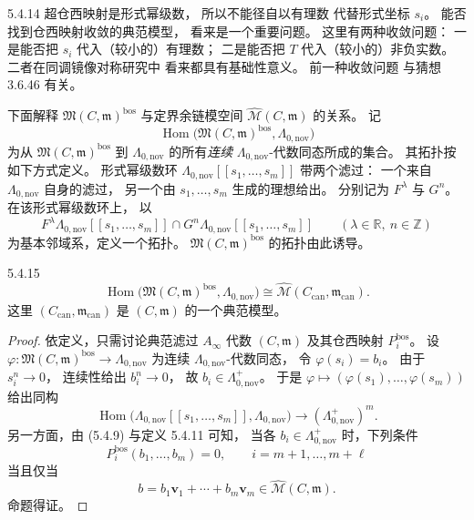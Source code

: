 \begin{remark}{5.4.14}\label{rem:5-4-14}
超仓西映射是形式幂级数，
所以不能径自以有理数
代替形式坐标 $s_i$。
能否找到仓西映射收敛的典范模型，
看来是一个重要问题。
这里有两种收敛问题：
一是能否把 $s_i$
代入（较小的）有理数；
二是能否把 $T$
代入（较小的）非负实数。
二者在同调镜像对称研究中
看来都具有基础性意义。
前一种收敛问题
与猜想 3.6.46 有关。
\end{remark}

下面解释
$\mathfrak M(C,\mathfrak m)^{\mathrm{bos}}$
与定界余链模空间
$\widehat{\mathcal M}(C,\mathfrak m)$
的关系。
记
\[
\operatorname{Hom}\bigl(
\mathfrak M(C,\mathfrak m)^{\mathrm{bos}},
\Lambda_{0,\mathrm{nov}}
\bigr)
\]
为从
$\mathfrak M(C,\mathfrak m)^{\mathrm{bos}}$
到 $\Lambda_{0,\mathrm{nov}}$
的所有\emph{连续}
$\Lambda_{0,\mathrm{nov}}$-代数同态所成的集合。
其拓扑按如下方式定义。
形式幂级数环
$\Lambda_{0,\mathrm{nov}}[[s_1,\ldots,s_m]]$
带两个滤过：
一个来自 $\Lambda_{0,\mathrm{nov}}$
自身的滤过，
另一个由
$s_1,\ldots,s_m$ 生成的理想给出。
分别记为 $F^\lambda$ 与 $G^n$。
在该形式幂级数环上，
以
\[
F^\lambda
\Lambda_{0,\mathrm{nov}}[[s_1,\ldots,s_m]]
\cap
G^n
\Lambda_{0,\mathrm{nov}}[[s_1,\ldots,s_m]]
\qquad
(\lambda\in\mathbb R,\ n\in\mathbb Z)
\]
为基本邻域系，定义一个拓扑。
$\mathfrak M(C,\mathfrak m)^{\mathrm{bos}}$
的拓扑由此诱导。

\begin{proposition}{5.4.15}\label{prop:5-4-15}
\[
\operatorname{Hom}\bigl(
\mathfrak M(C,\mathfrak m)^{\mathrm{bos}},
\Lambda_{0,\mathrm{nov}}
\bigr)
\cong
\widehat{\mathcal M}
(C_{\mathrm{can}},\mathfrak m_{\mathrm{can}}).
\]
这里
$(C_{\mathrm{can}},\mathfrak m_{\mathrm{can}})$
是 $(C,\mathfrak m)$ 的一个典范模型。
\end{proposition}

\begin{proof}
依定义，只需讨论典范滤过
$A_\infty$ 代数
$(C,\mathfrak m)$
及其仓西映射 $P_i^{\mathrm{bos}}$。
设
$\varphi\colon
\mathfrak M(C,\mathfrak m)^{\mathrm{bos}}
\to\Lambda_{0,\mathrm{nov}}$
为连续
$\Lambda_{0,\mathrm{nov}}$-代数同态，
令 $\varphi(s_i)=b_i$。
由于 $s_i^n\to0$，
连续性给出 $b_i^n\to0$，
故
$b_i\in\Lambda_{0,\mathrm{nov}}^+$。
于是
$\varphi\mapsto
(\varphi(s_1),\ldots,\varphi(s_m))$
给出同构
\[
\operatorname{Hom}\bigl(
\Lambda_{0,\mathrm{nov}}
[[s_1,\ldots,s_m]],
\Lambda_{0,\mathrm{nov}}
\bigr)
\longrightarrow
(\Lambda_{0,\mathrm{nov}}^+)^m.
\]
另一方面，由 (5.4.9)
与定义 5.4.11 可知，
当各
$b_i\in\Lambda_{0,\mathrm{nov}}^+$
时，下列条件
\begin{equation}
P_i^{\mathrm{bos}}(b_1,\ldots,b_m)=0,
\qquad
i=m+1,\ldots,m+\ell
\tag{5.4.16}\label{eq:5-4-16}
\end{equation}
当且仅当
\[
b=b_1\mathbf v_1+\cdots+
b_m\mathbf v_m
\in\widehat{\mathcal M}(C,\mathfrak m).
\]
命题得证。
\end{proof}

